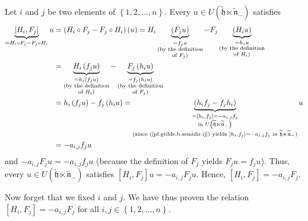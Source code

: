 \documentclass[etingof-lie.tex]{subfiles}
\begin{document}
\begin{verlong}
Let $i$ and $j$ be two elements of $\left\{  1,2,...,n\right\}  $. Every $u\in
U\left(  \widetilde{\mathfrak{h}}\ltimes\widetilde{\mathfrak{n}}_{-}\right)  $
satisfies%
\begin{align*}
\underbrace{\left[  H_{i},F_{j}\right]  }_{=H_{i}\circ F_{j}-F_{j}\circ H_{i}%
}u  &  =\left(  H_{i}\circ F_{j}-F_{j}\circ H_{i}\right)  \left(  u\right)
=H_{i}\underbrace{\left(  F_{j}u\right)  }_{\substack{=f_{j}u\\\text{(by the
definition}\\\text{of }F_{j}\text{)}}}-F_{j}\underbrace{\left(  H_{i}u\right)
}_{\substack{=h_{i}u\\\text{(by the definition}\\\text{of }H_{i}\text{)}}}\\
&  =\underbrace{H_{i}\left(  f_{j}u\right)  }_{\substack{=h_{i}\left(
f_{j}u\right)  \\\text{(by the definition}\\\text{of }H_{i}\text{)}%
}}-\underbrace{F_{j}\left(  h_{i}u\right)  }_{\substack{=f_{j}\left(
h_{i}u\right)  \\\text{(by the definition}\\\text{of }F_{j}\text{)}}}\\
&  =h_{i}\left(  f_{j}u\right)  -f_{j}\left(  h_{i}u\right)
=\underbrace{\left(  h_{i}f_{j}-f_{j}h_{i}\right)  }_{\substack{=\left[
h_{i},f_{j}\right]  =-a_{i,j}f_{j}\\\text{in }U\left(  \widetilde{\mathfrak{h}%
}\ltimes\widetilde{\mathfrak{n}}_{-}\right)  \\\text{(since
(\ref{pf.gtilde.b.semidir.ij}) yields }\left[  h_{i},f_{j}\right]
=-a_{i,j}f_{j}\text{ in }\widetilde{\mathfrak{h}}\ltimes
\widetilde{\mathfrak{n}}_{-}\text{)}}}u\\
&  =-a_{i,j}f_{j}u
\end{align*}
and $-a_{i,j}F_{j}u=-a_{i,j}f_{j}u$ (because the definition of $F_{j}$ yields
$F_{j}u=f_{j}u$). Thus, every $u\in U\left(  \widetilde{\mathfrak{h}}%
\ltimes\widetilde{\mathfrak{n}}_{-}\right)  $ satisfies $\left[  H_{i}%
,F_{j}\right]  u=-a_{i,j}F_{j}u$. Hence, $\left[  H_{i},F_{j}\right]
=-a_{i,j}F_{j}$.

Now forget that we fixed $i$ and $j$. We have thus proven the relation
$\left[  H_{i},F_{j}\right]  =-a_{i,j}F_{j}$ for all $i,j\in\left\{
1,2,...,n\right\}  $.
\end{verlong}

\bigskip
\end{document}
